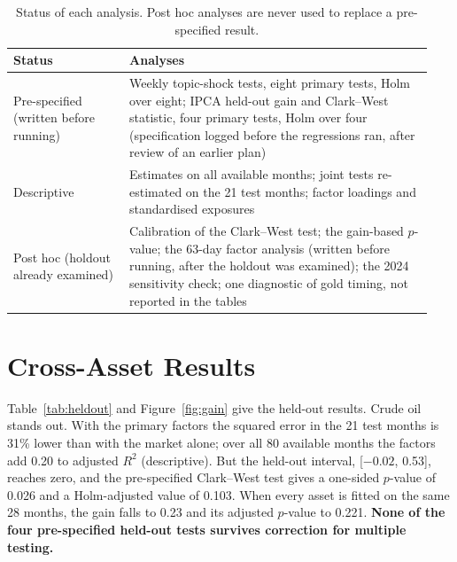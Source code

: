 \documentclass[11pt]{article}
\begin{document}
\begin{table}[t]
\centering\small
\begin{tabular}{@{}p{0.26\linewidth}p{0.68\linewidth}@{}}
\toprule
Status & Analyses \\
\midrule
Pre-specified (written before running) & Weekly topic-shock tests, eight primary tests, Holm over eight; IPCA held-out gain and Clark--West statistic, four primary tests, Holm over four (specification logged before the regressions ran, after review of an earlier plan) \\
\midrule
Descriptive & Estimates on all available months; joint tests re-estimated on the 21 test months; factor loadings and standardised exposures \\
\midrule
Post hoc (holdout already examined) & Calibration of the Clark--West test; the gain-based $p$-value; the 63-day factor analysis (written before running, after the holdout was examined); the 2024 sensitivity check; one diagnostic of gold timing, not reported in the tables \\
\bottomrule
\end{tabular}
\caption{Status of each analysis. Post hoc analyses are never used to replace a pre-specified result.}
\label{tab:status}
\end{table}

\section{Cross-Asset Results}
\label{sec:results}

Table~\ref{tab:heldout} and Figure~\ref{fig:gain} give the held-out results. Crude oil stands out. With the primary factors the squared error in the 21 test months is 31\% lower than with the market alone; over all 80 available months the factors add 0.20 to adjusted $R^2$ (descriptive). But the held-out interval, [$-0.02$, 0.53], reaches zero, and the pre-specified Clark--West test gives a one-sided $p$-value of 0.026 and a Holm-adjusted value of 0.103. When every asset is fitted on the same 28 months, the gain falls to 0.23 and its adjusted $p$-value to 0.221. \textbf{None of the four pre-specified held-out tests survives correction for multiple testing.}
\end{document}
